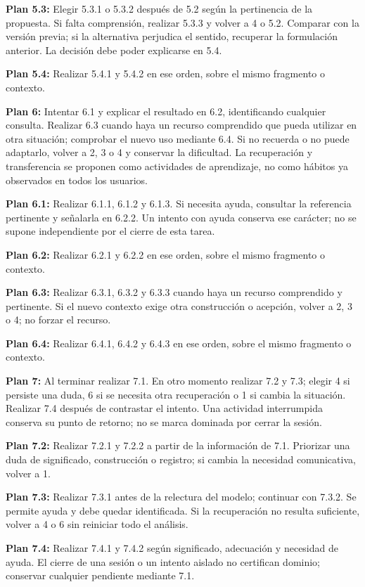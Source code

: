 \documentclass[10pt,a4paper]{article}
\begin{document}
\textbf{Plan 5.3:} Elegir 5.3.1 o 5.3.2 después de 5.2 según la pertinencia de la propuesta. Si falta comprensión, realizar 5.3.3 y volver a 4 o 5.2. Comparar con la versión previa; si la alternativa perjudica el sentido, recuperar la formulación anterior. La decisión debe poder explicarse en 5.4.\par
\textbf{Plan 5.4:} Realizar 5.4.1 y 5.4.2 en ese orden, sobre el mismo fragmento o contexto.\par
\textbf{Plan 6:} Intentar 6.1 y explicar el resultado en 6.2, identificando cualquier consulta. Realizar 6.3 cuando haya un recurso comprendido que pueda utilizar en otra situación; comprobar el nuevo uso mediante 6.4. Si no recuerda o no puede adaptarlo, volver a 2, 3 o 4 y conservar la dificultad. La recuperación y transferencia se proponen como actividades de aprendizaje, no como hábitos ya observados en todos los usuarios.\par
\textbf{Plan 6.1:} Realizar 6.1.1, 6.1.2 y 6.1.3. Si necesita ayuda, consultar la referencia pertinente y señalarla en 6.2.2. Un intento con ayuda conserva ese carácter; no se supone independiente por el cierre de esta tarea.\par
\textbf{Plan 6.2:} Realizar 6.2.1 y 6.2.2 en ese orden, sobre el mismo fragmento o contexto.\par
\textbf{Plan 6.3:} Realizar 6.3.1, 6.3.2 y 6.3.3 cuando haya un recurso comprendido y pertinente. Si el nuevo contexto exige otra construcción o acepción, volver a 2, 3 o 4; no forzar el recurso.\par
\textbf{Plan 6.4:} Realizar 6.4.1, 6.4.2 y 6.4.3 en ese orden, sobre el mismo fragmento o contexto.\par
\textbf{Plan 7:} Al terminar realizar 7.1. En otro momento realizar 7.2 y 7.3; elegir 4 si persiste una duda, 6 si se necesita otra recuperación o 1 si cambia la situación. Realizar 7.4 después de contrastar el intento. Una actividad interrumpida conserva su punto de retorno; no se marca dominada por cerrar la sesión.\par
\textbf{Plan 7.2:} Realizar 7.2.1 y 7.2.2 a partir de la información de 7.1. Priorizar una duda de significado, construcción o registro; si cambia la necesidad comunicativa, volver a 1.\par
\textbf{Plan 7.3:} Realizar 7.3.1 antes de la relectura del modelo; continuar con 7.3.2. Se permite ayuda y debe quedar identificada. Si la recuperación no resulta suficiente, volver a 4 o 6 sin reiniciar todo el análisis.\par
\textbf{Plan 7.4:} Realizar 7.4.1 y 7.4.2 según significado, adecuación y necesidad de ayuda. El cierre de una sesión o un intento aislado no certifican dominio; conservar cualquier pendiente mediante 7.1.\par
\end{document}
